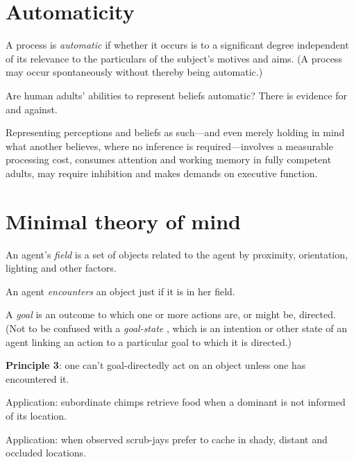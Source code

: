 \documentclass[11pt]{extarticle}
\begin{document}
\begin{multicols}{3}


\section{Automaticity}
A process is \emph{automatic} if whether it occurs is to a significant degree independent of its relevance to the particulars of the subject's motives and aims.
(A process may occur spontaneously without thereby being automatic.)  

Are human adults’ abilities to represent beliefs automatic?
There is evidence for\citep{kovacs_social_2010,Schneider:2011fk} and against.\citep{apperly:2008_back,apperly_why_2010} 

Representing perceptions and beliefs as such---and even merely holding in mind what another believes, where no inference is required---involves a measurable processing cost\citep{apperly:2008_back,apperly:2010_limits}, consumes attention and working memory in fully competent adults,\citealp{Apperly:2009cc, lin:2010_reflexively, McKinnon:2007rr} may require inhibition\citep{bull:2008_role} and makes demands on executive function.\citep{apperly:2004_frontal,samson:2005_seeing}


\section{Minimal theory of mind}
An agent’s \emph{field} is a set of objects related to the agent by proximity, orientation, lighting and other factors.

An agent \emph{encounters} an object just if it is in her field.

A \emph{goal} is an outcome to which one or more actions are, or might be, directed.  (Not to be confused with a \emph{goal-state} , which is an intention or other state of an agent linking an action to a particular goal to which it is directed.)


\textbf{Principle 3}: one can’t goal-directedly act on an object unless one has encountered it.

Application: subordinate chimps retrieve food when a dominant is not informed of its location.\citep{Hare:2001ph}

Application: when observed scrub-jays prefer to cache in shady, distant and occluded locations.\citep{Dally:2004xf,Clayton:2007fh}


\end{multicols}
\end{document}
